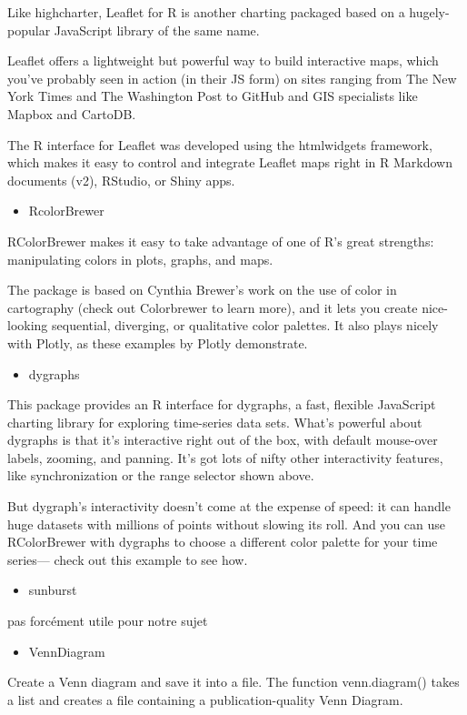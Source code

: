 \documentclass[
]{report}
\providecommand{\tightlist}{%
  \setlength{\itemsep}{0pt}\setlength{\parskip}{0pt}}
\begin{document}
Like highcharter, Leaflet for R is another charting packaged based on a hugely-popular JavaScript library of the same name.

Leaflet offers a lightweight but powerful way to build interactive maps, which you've probably seen in action (in their JS form) on sites ranging from The New York Times and The Washington Post to GitHub and GIS specialists like Mapbox and CartoDB.

The R interface for Leaflet was developed using the htmlwidgets framework, which makes it easy to control and integrate Leaflet maps right in R Markdown documents (v2), RStudio, or Shiny apps.

\begin{itemize}
\tightlist
\item
  RcolorBrewer
\end{itemize}

RColorBrewer makes it easy to take advantage of one of R's great strengths: manipulating colors in plots, graphs, and maps.

The package is based on Cynthia Brewer's work on the use of color in cartography (check out Colorbrewer to learn more), and it lets you create nice-looking sequential, diverging, or qualitative color palettes. It also plays nicely with Plotly, as these examples by Plotly demonstrate.

\begin{itemize}
\tightlist
\item
  dygraphs
\end{itemize}

This package provides an R interface for dygraphs, a fast, flexible JavaScript charting library for exploring time-series data sets. What's powerful about dygraphs is that it's interactive right out of the box, with default mouse-over labels, zooming, and panning. It's got lots of nifty other interactivity features, like synchronization or the range selector shown above.

But dygraph's interactivity doesn't come at the expense of speed: it can handle huge datasets with millions of points without slowing its roll. And you can use RColorBrewer with dygraphs to choose a different color palette for your time series--- check out this example to see how.

\begin{itemize}
\tightlist
\item
  sunburst
\end{itemize}

pas forcément utile pour notre sujet

\begin{itemize}
\tightlist
\item
  VennDiagram
\end{itemize}

Create a Venn diagram and save it into a file. The function venn.diagram() takes a list and creates a file containing a publication-quality Venn Diagram.

  
\end{document}
